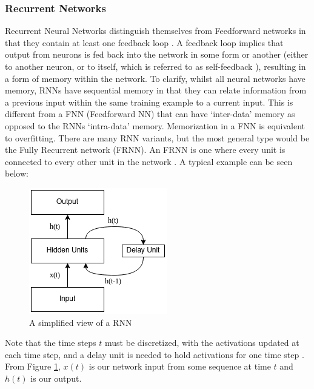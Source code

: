 \documentclass[12pt]{article}
\begin{document}
\subsubsection{Recurrent Networks}
Recurrent Neural Networks distinguish themselves from Feedforward networks in that they contain at least one feedback loop \autocite{haykin2010neural}. A feedback loop implies that output from neurons is fed back into the network in some form or another (either to another neuron, or to itself, which is referred to as self-feedback \autocite{haykin2010neural}), resulting in a form of memory within the network. 
To clarify, whilst all neural networks have memory, RNNs have sequential memory in that they can relate information from a previous input within the same training example to a current input. This is different from a FNN (Feedforward NN) that can have `inter-data' memory as opposed to the RNNs `intra-data' memory. Memorization in a FNN is equivalent to overfitting. There are many RNN variants, but the most general type would be the Fully Recurrent network (FRNN).
An FRNN is one where every unit is connected to every other unit in the network \autocite{279210}. A typical example can be seen below:
\begin{figure}[H]
    \centering
    \includegraphics[scale=0.7]{6.png}
    \caption{A simplified view of a RNN}
    \label{rnn}
\end{figure}
Note that the time steps $t$ must be discretized, with the activations updated at each time step, and a delay unit is needed to hold activations for one time step \autocite{bullinaria2013recurrent}. From Figure \ref{rnn}, $x(t)$ is our network input from some sequence at time $t$ and $h(t)$ is our output. 
\end{document}
